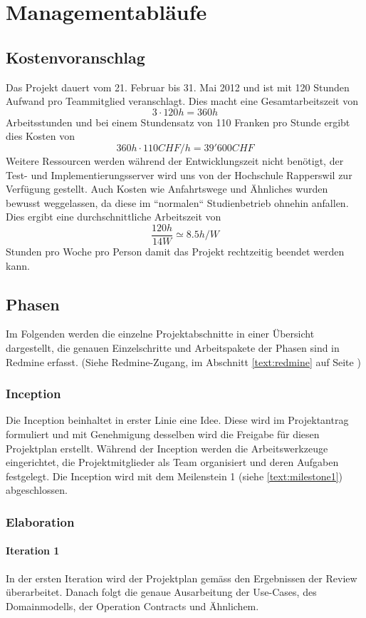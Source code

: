 \chapter{Managementabläufe}
\section{Kostenvoranschlag}
Das Projekt dauert vom 21. Februar bis 31. Mai 2012 und ist mit 120 Stunden Aufwand pro Teammitglied veranschlagt. Dies macht eine Gesamtarbeitszeit von $$3 \cdot 120h=360h$$ Arbeitsstunden und bei einem Stundensatz von 110 Franken pro Stunde ergibt dies Kosten von $$360h \cdot 110CHF/h=39'600CHF$$ Weitere Ressourcen werden während der Entwicklungszeit nicht benötigt, der Test- und Implementierungsserver wird uns von der Hochschule Rapperswil zur Verfügung gestellt. Auch Kosten wie Anfahrtswege und Ähnliches wurden bewusst weggelassen, da diese im ``normalen`` Studienbetrieb ohnehin anfallen.
Dies ergibt eine durchschnittliche Arbeitszeit von $$\frac{120h}{14W} \simeq 8.5h/W$$ Stunden pro Woche pro Person damit das Projekt rechtzeitig beendet werden kann.

\section{Phasen}
Im Folgenden werden die einzelne Projektabschnitte in einer Übersicht dargestellt, die genauen Einzelschritte und Arbeitspakete der Phasen sind in Redmine erfasst. (Siehe Redmine-Zugang, im Abschnitt \ref{text:redmine} auf Seite \pageref{text:redmine})
\subsection{Inception}
Die Inception beinhaltet in erster Linie eine Idee. Diese wird im Projektantrag formuliert und mit Genehmigung desselben wird die Freigabe für diesen Projektplan erstellt. Während der Inception werden die Arbeitswerkzeuge eingerichtet, die Projektmitglieder als Team organisiert und deren Aufgaben festgelegt. Die Inception wird mit dem Meilenstein 1 (siehe \ref{text:milestone1}) abgeschlossen.
\subsection{Elaboration}
\subsubsection{Iteration 1}
In der ersten Iteration wird der Projektplan gemäss den Ergebnissen der Review überarbeitet. Danach folgt die genaue Ausarbeitung der Use-Cases, des Domainmodells, der Operation Contracts und Ähnlichem.
